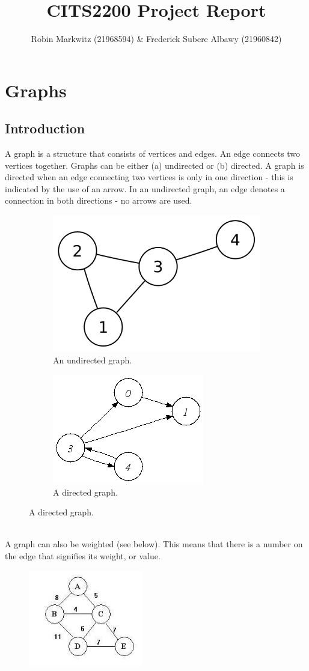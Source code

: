\documentclass[11pt]{article}
\title{CITS2200 Project Report}
\author{Robin Markwitz (21968594) \& Frederick Subere Albawy (21960842)}
\begin{document}
	\maketitle
	\section{Graphs}
	\subsection{Introduction}
	A graph is a structure that consists of vertices and edges. An edge connects two vertices together.
	Graphs can be either (a) undirected or (b) directed. A graph is directed when an edge connecting two vertices is only in one direction - this is indicated by the use of an arrow. In an undirected graph, an edge denotes a connection in both directions - no arrows are used.
	\begin{figure}[h!]
		\centering
		\begin{subfigure}{.5\textwidth}
			\centering
			\includegraphics[width=.4\linewidth]{images/Undirected_graph.jpg}
			\caption{An undirected graph.}
			\label{fig:sub1}
		\end{subfigure}%
		\begin{subfigure}{.5\textwidth}
			\centering
			\includegraphics[width=.4\linewidth]{images/directedGraph.jpg}
			\caption{A directed graph.}
			\label{fig:sub2}
		\end{subfigure}
		\label{fig:test}
	\end{figure}
	\\
	A graph can also be weighted (see below). This means that there is a number on the edge that signifies its weight, or value.
	\begin{figure}[h!]
		\centering
		\includegraphics[width=50mm,scale=0.5]{images/weighted_graph.jpg}
	\end{figure}
	\newpage
\end{document}
